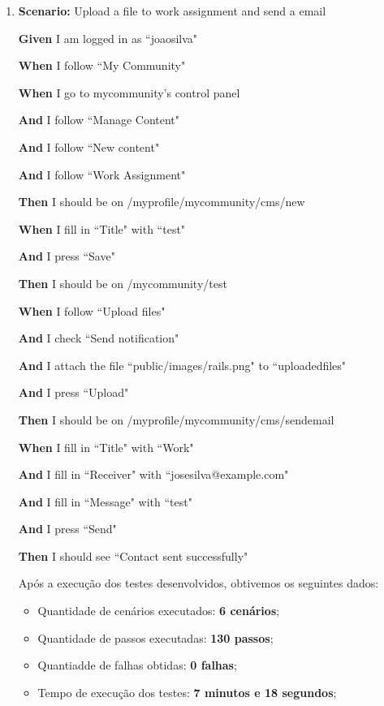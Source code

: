 \begin{enumerate}
\item  \textbf{Scenario:} Upload a file to work assignment and send a email
    
    \textbf{Given} I am logged in as ``joaosilva" 
    
    \textbf{When} I follow ``My Community"
    
    \textbf{When} I go to mycommunity's control panel
    
    \textbf{And} I follow ``Manage Content"
    
    \textbf{And} I follow ``New content"
    
    \textbf{And} I follow ``Work Assignment"
    
    \textbf{Then} I should be on /myprofile/mycommunity/cms/new
    
    \textbf{When} I fill in ``Title" with ``test"
    
    \textbf{And} I press ``Save"
    
    \textbf{Then} I should be on /mycommunity/test
    
    \textbf{When} I follow ``Upload files"
    
    \textbf{And} I check ``Send notification"
    
    \textbf{And} I attach the file ``public/images/rails.png" to ``uploadedfiles"
    
    \textbf{And} I press ``Upload"
    
    \textbf{Then} I should be on /myprofile/mycommunity/cms/sendemail
    
    \textbf{When} I fill in ``Title" with ``Work"
    
    \textbf{And} I fill in ``Receiver" with ``josesilva@example.com"
    
    \textbf{And} I fill in ``Message" with ``test"
    
    \textbf{And} I press ``Send"
    
    \textbf{Then} I should see ``Contact sent successfully"

Após a execução dos testes desenvolvidos, obtivemos os seguintes dados:

\begin{itemize}
\item Quantidade de cenários executados: \textbf{6 cenários};
\item Quantidade de passos executadas: \textbf{130 passos};
\item Quantiadde de falhas obtidas: \textbf{0 falhas};
\item Tempo de execução dos testes: \textbf{7 minutos e 18 segundos};
\end{itemize}


\end{enumerate}
